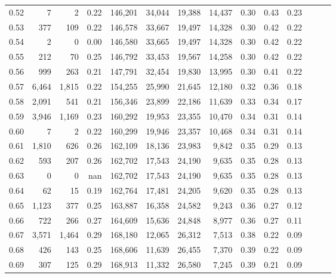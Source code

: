 \begin{tabular}{rrrrrrrrrrrrrr}
0.52 &       7 &      2 &  0.22 &  146,201 &   34,044 &  19,388 &  14,437 &  0.30 &  0.43 &      0.23 \\
0.53 &     377 &    109 &  0.22 &  146,578 &   33,667 &  19,497 &  14,328 &  0.30 &  0.42 &      0.22 \\
0.54 &       2 &      0 &  0.00 &  146,580 &   33,665 &  19,497 &  14,328 &  0.30 &  0.42 &      0.22 \\
0.55 &     212 &     70 &  0.25 &  146,792 &   33,453 &  19,567 &  14,258 &  0.30 &  0.42 &      0.22 \\
0.56 &     999 &    263 &  0.21 &  147,791 &   32,454 &  19,830 &  13,995 &  0.30 &  0.41 &      0.22 \\
0.57 &   6,464 &  1,815 &  0.22 &  154,255 &   25,990 &  21,645 &  12,180 &  0.32 &  0.36 &      0.18 \\
0.58 &   2,091 &    541 &  0.21 &  156,346 &   23,899 &  22,186 &  11,639 &  0.33 &  0.34 &      0.17 \\
0.59 &   3,946 &  1,169 &  0.23 &  160,292 &   19,953 &  23,355 &  10,470 &  0.34 &  0.31 &      0.14 \\
0.60 &       7 &      2 &  0.22 &  160,299 &   19,946 &  23,357 &  10,468 &  0.34 &  0.31 &      0.14 \\
0.61 &   1,810 &    626 &  0.26 &  162,109 &   18,136 &  23,983 &   9,842 &  0.35 &  0.29 &      0.13 \\
0.62 &     593 &    207 &  0.26 &  162,702 &   17,543 &  24,190 &   9,635 &  0.35 &  0.28 &      0.13 \\
0.63 &       0 &      0 &   nan &  162,702 &   17,543 &  24,190 &   9,635 &  0.35 &  0.28 &      0.13 \\
0.64 &      62 &     15 &  0.19 &  162,764 &   17,481 &  24,205 &   9,620 &  0.35 &  0.28 &      0.13 \\
0.65 &   1,123 &    377 &  0.25 &  163,887 &   16,358 &  24,582 &   9,243 &  0.36 &  0.27 &      0.12 \\
0.66 &     722 &    266 &  0.27 &  164,609 &   15,636 &  24,848 &   8,977 &  0.36 &  0.27 &      0.11 \\
0.67 &   3,571 &  1,464 &  0.29 &  168,180 &   12,065 &  26,312 &   7,513 &  0.38 &  0.22 &      0.09 \\
0.68 &     426 &    143 &  0.25 &  168,606 &   11,639 &  26,455 &   7,370 &  0.39 &  0.22 &      0.09 \\
0.69 &     307 &    125 &  0.29 &  168,913 &   11,332 &  26,580 &   7,245 &  0.39 &  0.21 &      0.09 \\

\end{tabular}

